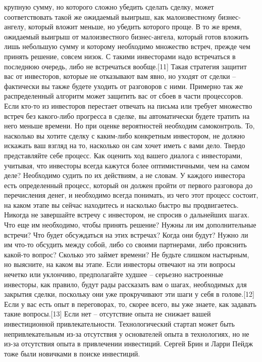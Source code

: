 \documentclass[ebook,12pt,oneside,openany]{memoir}
\begin{document}
крупную сумму, но которого сложно убедить сделать сделку, может
соответствовать такой же ожидаемый выигрыш, как малоизвестному
бизнес-ангелу, который вложит меньше, но убедить которого проще. В то
же время, ожидаемый выигрыш от малоизвестного бизнес-ангела, который
готов вложить лишь небольшую сумму и которому необходимо множество
встреч, прежде чем принять решение, совсем низок. С такими инвесторами
надо встречаться в последнюю очередь, либо не встречаться вообще.[11]
Такая стратегия защитит вас от инвесторов, которые не отказывают вам
явно, но уходят от сделки – фактически вы также будете уходить от
разговоров с ними. Примерно так же распределенный алгоритм может
защитить вас от сбоев в части процессоров. Если кто-то из инвесторов
перестает отвечать на письма или требует множество встреч без
какого-либо прогресса в сделке, вы автоматически будете тратить на
него меньше времени. Но при оценке вероятностей необходим
самоконтроль. То, насколько вы хотите сделку с каким-либо конкретным
инвестором, не должно искажать ваш взгляд на то, насколько он сам
хочет иметь с вами дело. Твердо представляйте себе процесс. Как
оценить ход вашего диалога с инвесторами, учитывая, что инвесторы
всегда кажутся более оптимистичными, чем на самом деле? Необходимо
судить по их действиям, а не словам. У каждого инвестора есть
определенный процесс, который он должен пройти от первого разговора до
перечисления денег, и необходимо всегда понимать, из чего этот процесс
состоит, на каком этапе вы сейчас находитесь и насколько быстро вы
продвигаетесь. Никогда не завершайте встречу с инвестором, не спросив
о дальнейших шагах. Что еще им необходимо, чтобы принять решение?
Нужны ли им дополнительные встречи? Что будет обсуждаться на этих
встречах? Когда они будут? Нужно ли им что-то обсудить между собой,
либо со своими партнерами, либо прояснить какой-то вопрос? Сколько это
займет времени? Не будьте слишком настырным, но выясните, на каком вы
этапе. Если инвесторы отвечают на эти вопросы нечетко или уклончиво,
предполагайте худшее – серьезно настроенные инвесторы, как правило,
будут рады рассказать вам о шагах, необходимых для закрытия сделки,
поскольку они уже прокручивают эти шаги у себя в голове.[12] Если у
вас есть опыт в переговорах, то, скорее всего, вы уже знаете, как
задавать такие вопросы.[13] Если нет – отсутствие опыта не снижает
вашей инвестиционной привлекательности. Технологический стартап может
быть непривлекательным из-за отсутствия у основателей опыта в
технологиях, но не из-за отсутствия опыта в привлечении инвестиций.
Сергей Брин и Ларри Пейдж тоже были новичками в поиске инвестиций.
\end{document}
